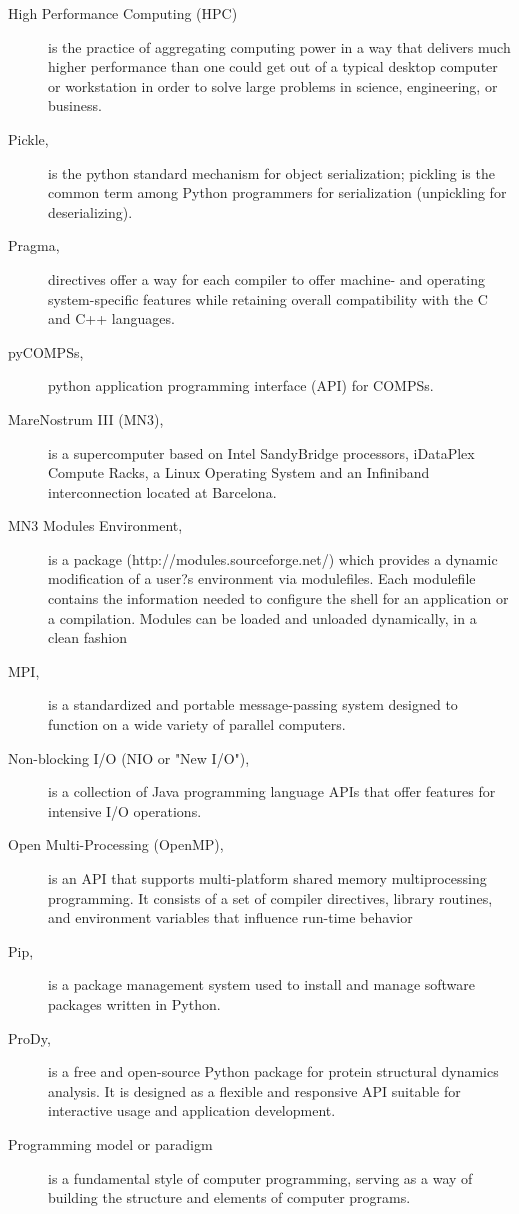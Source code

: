 \begin{description}
\item [High Performance Computing (HPC)] is the practice of aggregating computing power in a way that delivers much higher performance than one could get out of a typical desktop computer or workstation in order to solve large problems in science, engineering, or business.
\item [Pickle,] is the python standard mechanism for object serialization; pickling is the common term among Python programmers for serialization (unpickling for deserializing).
\item [Pragma,] directives offer a way for each compiler to offer machine- and operating system-specific features while retaining overall compatibility with the C and C++ languages.
\item[pyCOMPSs,] python application programming interface (API) for COMPSs.
\item  [MareNostrum III (MN3),]  is a supercomputer based on Intel SandyBridge processors, iDataPlex Compute Racks, a Linux Operating System and an Infiniband interconnection located at Barcelona.
\item [MN3 Modules Environment,] is a package (http://modules.sourceforge.net/) which provides a dynamic modification
of a user?s environment via modulefiles. Each modulefile contains the information needed to
configure the shell for an application or a compilation. Modules can be loaded and unloaded dynamically,
in a clean fashion
\item[MPI,] is a standardized and portable message-passing system designed to function on a wide variety of parallel computers.
\item [Non-blocking I/O (NIO or "New I/O"),] is a collection of Java programming language APIs that offer features for intensive I/O operations. 
\item [Open Multi-Processing (OpenMP),] is an API that supports multi-platform shared memory multiprocessing programming. It consists of a set of compiler directives, library routines, and environment variables that influence run-time behavior
\item [Pip,] is a package management system used to install and manage software packages written in Python.
\item [ProDy,] is a free and open-source Python package for protein structural dynamics analysis. It is designed as a flexible and responsive API suitable for interactive usage and application development.
\item [Programming model or paradigm] is a fundamental style of computer programming, serving as a way of building the structure and elements of computer programs.

\end{description}
